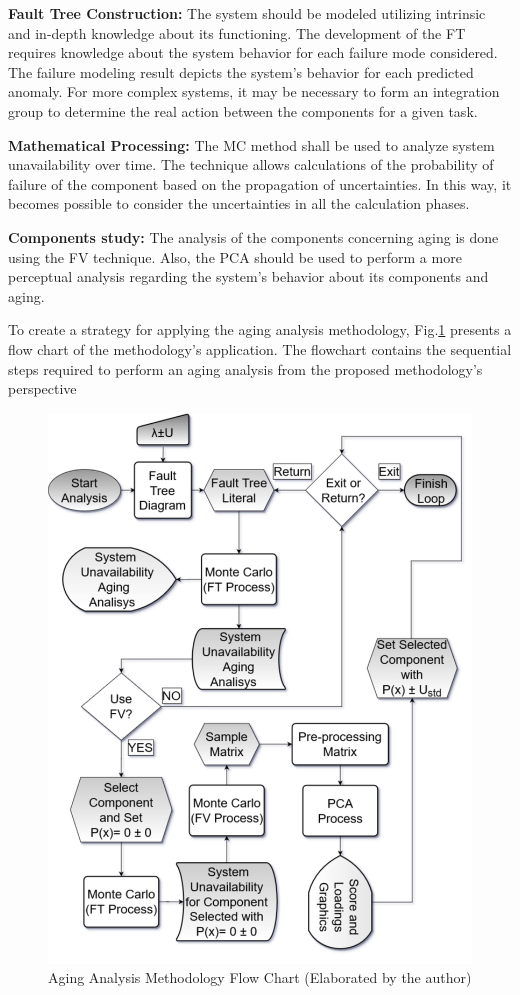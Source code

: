 \documentclass{ws-m3as}
\begin{document}
\begin{romanlist}[(ii)]
	\item \textbf{Fault Tree Construction:}
	The system should be modeled utilizing intrinsic and in-depth knowledge about its functioning. The development of the FT requires knowledge about the system behavior for each failure mode considered. The failure modeling result depicts the system's behavior for each predicted anomaly. For more complex systems, it may be necessary to form an integration group to determine the real action between the components for a given task. 
	\item \textbf{Mathematical Processing:} The MC method shall be used to analyze system unavailability over time. The technique allows calculations of the probability of failure of the component based on the propagation of uncertainties. In this way, it becomes possible to consider the uncertainties in all the calculation phases.
	\item \textbf{Components study:} The analysis of the components concerning aging is done using the FV technique. Also, the PCA should be used to perform a more perceptual analysis regarding the system's behavior about its components and aging.
\end{romanlist}


To create a strategy for applying the aging analysis methodology, Fig.\ref{fig:6} presents a flow chart of the methodology's application. The flowchart contains the sequential steps required to perform an aging analysis from the proposed methodology's perspective

\begin{figure} [H] 
	\centering 
	\includegraphics[width=0.8\linewidth]{Figures/Fluxograma}
	\caption{Aging Analysis Methodology Flow Chart (Elaborated by the author)}
	\label{fig:6}
\end{figure}
\end{document}
